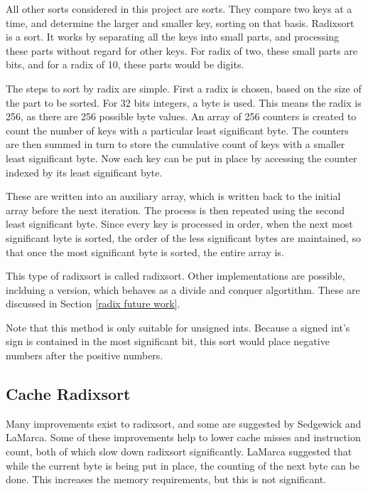 \label{radix}

All other sorts considered in this project are  sorts.
They compare two keys at a time, and determine the larger and smaller key,
sorting on that basis. Radixsort is a  sort. It works by
separating all the keys into small parts, and processing these parts without
regard for other keys. For radix of two, these small parts are bits, and for a
radix of 10, these parts would be digits. 

The steps to sort by radix are simple. First a radix is chosen, based on the
size of the part to be sorted. For 32 bits integers, a byte is used. This means
the radix is 256, as there are 256 possible byte values. An array of 256
counters is created to count the number of keys with a particular least
significant byte. The counters are then summed in turn to store the cumulative
count of keys with a smaller least significant byte. Now each key can be put in
place by accessing the counter indexed by its least significant byte.

These are written into an auxiliary array, which is written back to the initial
array before the next iteration. The process is then repeated using the second
least significant byte.  Since every key is processed in order, when the next
most significant byte is sorted, the order of the less significant bytes are
maintained, so that once the most significant byte is sorted, the entire array
is.

This type of radixsort is called  radixsort.
Other implementations are possible, inclduing a 
version, which behaves as a divide and conquer algortithm. These are discussed
in Section \ref{radix future work}.

Note that this method is only suitable for unsigned ints. Because a signed int's
sign is contained in the most significant bit, this sort would place negative
numbers after the positive numbers.

\subsection{Cache Radixsort}
Many improvements exist to radixsort, and some are suggested by Sedgewick and
LaMarca. Some of these improvements help to lower cache misses and instruction
count, both of which slow down radixsort significantly. LaMarca suggested
that while the current byte is being put in place, the counting of the next byte
can be done. This increases the memory requirements, but this is not
significant.

